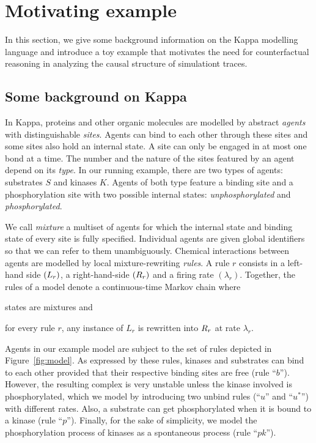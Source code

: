\pagebreak

\section{Motivating example}\label{sec:example}


In this section, we give some background information on the Kappa
modelling language and introduce a toy example that motivates the need
for counterfactual reasoning in analyzing the causal structure of
simulationt traces.


\subsection{Some background on Kappa}

In Kappa, proteins and other organic molecules are modelled by
abstract \emph{agents} with distinguishable \emph{sites}. Agents can
bind to each other through these sites and some sites also hold an
internal state. A site can only be engaged in at most one bond at a
time. The number and the nature of the sites featured by an agent
depend on its \emph{type}.
In our running example, there are two types
of agents: substrates $S$ and kinases $K$. Agents of both type feature
a binding site and a phosphorylation site with two possible
internal states: \emph{unphosphorylated} and \emph{phosphorylated}.

We call \emph{mixture} a multiset of agents for which the internal
state and binding state of every site is fully specified.  Individual
agents are given global identifiers so that we can refer to them
unambiguously. 
\noindent
Chemical interactions between agents are modelled by local
mixture-rewriting \emph{rules}.  A rule $r$ consists in a left-hand
side $(L_{r})$, a right-hand-side $(R_{r})$ and a firing rate
$(\lambda_r)$.  Together, the rules of a model denote a continuous-time
Markov chain where
\begin{inparaenum}[i)]
\item states are mixtures and
\item for every rule $r$,
any instance of $L_r$ is rewritten into $R_{r}$ at rate
$\lambda_r$.
\end{inparaenum}
Agents in our example model are subject to the set of
rules depicted in Figure~\ref{fig:model}. As expressed by these rules,
kinases and substrates can bind to each other provided that their
respective binding sites are free (rule ``$b$''). However, the
resulting complex is very unstable unless the kinase involved is
phosphorylated, which we model by introducing two unbind rules
(``$u$'' and ``$u^{*}$'') with different rates. Also, a substrate can
get phosphorylated when it is bound to a kinase (rule
``$p$''). Finally, for the sake of simplicity, we model the
phosphorylation process of kinases as a spontaneous process (rule
``$pk$''). 

